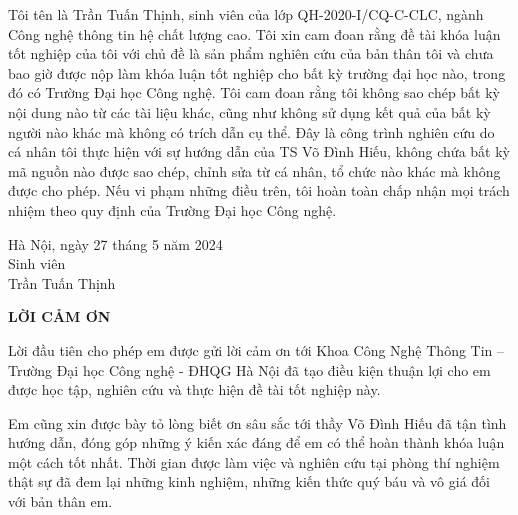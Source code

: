 
Tôi tên là Trần Tuấn Thịnh, sinh viên của lớp QH-2020-I/CQ-C-CLC, ngành Công nghệ thông tin hệ chất lượng cao.
Tôi xin cam đoan rằng đề tài khóa luận tốt nghiệp của tôi với chủ đề  là sản phẩm nghiên cứu của bản thân tôi và chưa bao giờ được nộp làm khóa luận tốt nghiệp cho bất kỳ trường đại học nào, trong đó có Trường Đại học Công nghệ.
Tôi cam đoan rằng tôi không sao chép bất kỳ nội dung nào từ các tài liệu khác, cũng như không sử dụng kết quả của bất kỳ người nào khác mà không có trích dẫn cụ thể.
Đây là công trình nghiên cứu do cá nhân tôi thực hiện với sự hướng dẫn của TS Võ Đình Hiếu, không chứa bất kỳ mã nguồn nào được sao chép, chỉnh sửa từ cá nhân, tổ chức nào khác mà không được cho phép.
Nếu vi phạm những điều trên, tôi hoàn toàn chấp nhận mọi trách nhiệm theo quy định của Trường Đại học Công nghệ.

\begin{flushright}
	\begin{varwidth}{\linewidth}\centering
		Hà Nội, ngày 27 tháng 5 năm 2024\\
		Sinh viên\\[2cm]
		Trần Tuấn Thịnh
	\end{varwidth}
\end{flushright}

\newpage

\begin{center}
    \textbf{LỜI CẢM ƠN}
\end{center}

Lời đầu tiên cho phép em được gửi lời cảm ơn tới Khoa Công Nghệ Thông Tin – Trường Đại học Công nghệ - ĐHQG Hà Nội đã tạo điều kiện thuận lợi cho em được học tập, nghiên cứu và thực hiện đề tài tốt nghiệp này.

Em cũng xin được bày tỏ lòng biết ơn sâu sắc tới thầy Võ Đình Hiếu đã tận tình hướng dẫn, đóng góp những ý kiến xác đáng để em có thể hoàn thành khóa luận một cách tốt nhất.
Thời gian được làm việc và nghiên cứu tại phòng thí nghiệm thật sự đã đem lại những kinh nghiệm, những kiến thức quý báu và vô giá đối với bản thân em.

